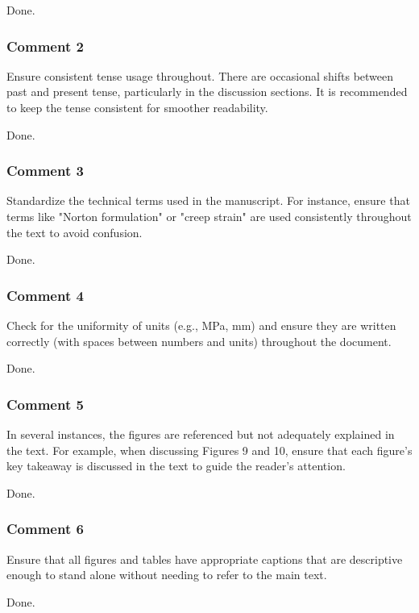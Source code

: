 \documentclass{ar2rc}
\begin{document}
{	\AR Done.
	
	\subsubsection{Comment 2}
	
	\RC Ensure consistent tense usage throughout. There are occasional shifts between past and present tense, particularly in the discussion sections. It is recommended to keep the tense consistent for smoother readability.
	
	\AR Done.
	
	\subsubsection{Comment 3}
	
	\RC Standardize the technical terms used in the manuscript. For instance, ensure that terms like "Norton formulation" or "creep strain" are used consistently throughout the text to avoid confusion.
	
	\AR Done.
	
	\subsubsection{Comment 4}
	
	\RC Check for the uniformity of units (e.g., MPa, mm) and ensure they are written correctly (with spaces between numbers and units) throughout the document.
	
	\AR Done.
	
	\subsubsection{Comment 5}
	
	\RC In several instances, the figures are referenced but not adequately explained in the text. For example, when discussing Figures 9 and 10, ensure that each figure's key takeaway is discussed in the text to guide the reader's attention.
	
	\AR Done.
	
	\subsubsection{Comment 6}
	
	\RC Ensure that all figures and tables have appropriate captions that are descriptive enough to stand alone without needing to refer to the main text.
	
	\AR Done.
	
}
\end{document}
